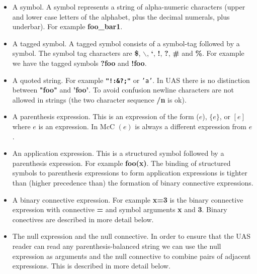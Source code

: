 \documentclass{article}
\begin{document}
\begin{itemize}
\item A symbol.  A symbol represents a string of alpha-numeric characters (upper and lower case letters of the alphabet, plus the decimal numerals, plus underbar).
  For example {\bf  foo\_bar1}.
\item A tagged symbol.  A tagged symbol consists of a symbol-tag followed by a symbol.  The symbol tag characters are {\bf \$}, {\bf $\backslash$}, {\bf `}, {\bf !}, {\bf ?}, {\bf \#} and {\bf \%}.
  For example we have the tagged symbols {\bf ?foo} and {\bf !foo}.
\item A quoted string.  For example {\bf \tt "!:\&?;"} or {\tt 'a'}.  In UAS there is no distinction between {\bf "foo"} and {\bf 'foo'}.  To avoid confusion newline characters are not allowed in strings (the two character sequence {\bf /n} is ok).
\item A parenthesis expression.  This is an expression of the form ($e$), $\{e\}$, or $[e]$ where $e$ is an expression.  In McC $(e)$ is always a different expression from $e$.
\item An application expression.  This is a structured symbol followed by a parenthesis expression.  For example {\bf foo(x)}.
The binding of structured symbols to parenthesis expressions to form application expressions is tighter than (higher precedence than) the formation of binary connective expressions.
\item A binary connective expression.  For example {\bf x=3} is the binary connective expression with connective {\bf =} and symbol arguments {\bf x} and {\bf 3}.  Binary conectives are described in more detail below.
\item The null expression and the null connective. In order to ensure that the UAS reader can read any parenthesis-balanced string we can use the null
  expression as arguments and the null connective to combine pairs of adjacent expressions.  This is described in more detail below.
\end{itemize}
\end{document}
